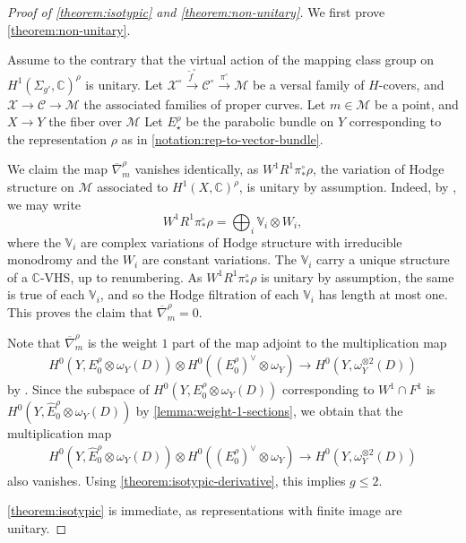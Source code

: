 \documentclass[12 pt]{amsart}
\theoremstyle{plain}
\theoremstyle{definition}
\theoremstyle{remark}
\numberwithin{equation}{section}
\begin{document}
\begin{proof}[Proof of \autoref{theorem:isotypic} and \autoref{theorem:non-unitary}]
We first prove \autoref{theorem:non-unitary}.

	Assume to the contrary that the virtual action of  
the mapping class group on $H^1(\Sigma_{g'}, \mathbb
	C)^\rho$ is unitary. Let 
	$\mathscr{X}^\circ\xrightarrow{\widetilde{f}^\circ}
	\mathscr{C}^\circ\xrightarrow{\pi^\circ} \mathscr{M}$ be a versal
	family of $H$-covers, and $\mathscr{X}\to \mathscr{C}\to \mathscr{M}$ the associated families of proper curves. Let $m\in \mathscr{M}$ be a point, and $X\to Y$ the fiber over $\mathscr{M}$ 
	Let $E^\rho_\star$ be the parabolic bundle on $Y$ corresponding to the
	representation $\rho$ as in \autoref{notation:rep-to-vector-bundle}.
	
	We claim the map
	$\overline\nabla_m^\rho$ vanishes identically, as $W^1R^1\pi^\circ_*\rho$, the variation of Hodge structure on $\mathscr{M}$ associated to $H^1(X, \mathbb
	C)^\rho$, is unitary by assumption. Indeed, by
	\cite[1.13]{deligne1987theoreme}, we may write
	$$W^1R^1\pi^\circ_*\rho=\bigoplus_i \mathbb{V}_i\otimes W_i,$$ where the
	$\mathbb{V}_i$ are complex variations of Hodge structure with
	irreducible monodromy and the $W_i$ are constant variations. The
	$\mathbb{V}_i$ carry a unique structure of a $\mathbb{C}$-VHS, up to
	renumbering. As $W^1R^1\pi^\circ_*\rho$ is unitary by assumption, the
	same is true of each $\mathbb{V}_i$, and so the Hodge filtration of each
	$\mathbb V_i$ has length at most one. This proves the claim that
	$\overline\nabla_m^\rho = 0$.
	
Note that $\overline{\nabla}^\rho_m$ is the weight $1$ part of
the map adjoint to the multiplication map
\begin{align*}
	H^0(Y, E^\rho_0 \otimes \omega_Y(D)) \otimes H^0((E^\rho_0)^\vee
	\otimes \omega_Y) \to H^0(Y, \omega_Y^{\otimes 2}(D))
\end{align*}
	by \cite[Theorem 4.1.6]{landesmanL:canonical-representations}.
	Since the 
	subspace of $H^0(Y, E^\rho_0 \otimes \omega_Y(D))$ corresponding to $W^1\cap F^1$
	is $H^0(Y, \widehat{E}_0^\rho \otimes \omega_Y(D))$ by
	\autoref{lemma:weight-1-sections},
	we obtain that the multiplication map
	\begin{align*}
		H^0(Y, \widehat{E}_0^\rho \otimes \omega_Y(D)) \otimes H^0((E^\rho_0)^\vee
	\otimes \omega_Y) \to H^0(Y, \omega_Y^{\otimes 2}(D))
	\end{align*}
	also vanishes.
	Using \autoref{theorem:isotypic-derivative}, this implies $g \leq 2$.
	
	\autoref{theorem:isotypic} is immediate, as representations with finite image are unitary.
\end{proof}
\end{document}
